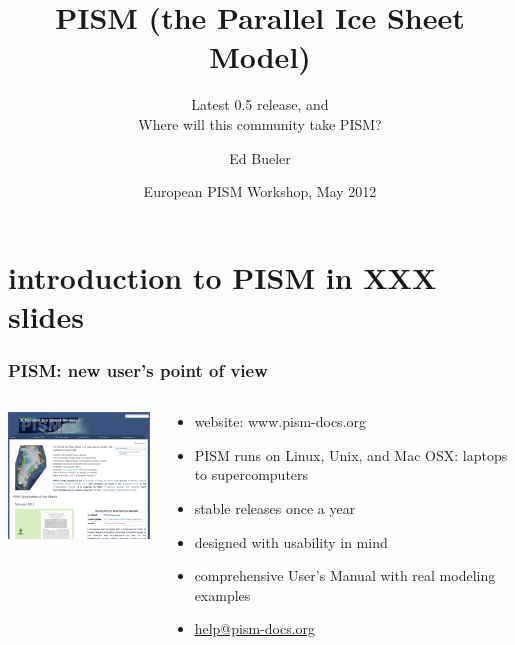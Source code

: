 \documentclass[hide notes,intlimits]{beamer}
\title[PISM (the Parallel Ice Sheet Model)] %
{PISM (the Parallel Ice Sheet Model)}
\subtitle{Latest 0.5 release, and \\ Where will this community take PISM?}
\author[Bueler]{Ed Bueler}
\institute{
University of Alaska Fairbanks
}
\date{European PISM Workshop, May 2012}
\begin{document}


{
} 

\begin{frame}
  \titlepage
\end{frame}

{
}

\section[introduction]{introduction to PISM in XXX slides}

\begin{frame}
  \frametitle{PISM: new user's point of view}
  \begin{columns}
    \begin{column}{50mm}
      \includegraphics[width=50mm]{pismdocs.png}
    \end{column}
    \begin{column}{70mm}
      \begin{itemize}
      \item website: \alert{www.pism-docs.org}
      \item PISM runs on Linux, Unix, and Mac OSX: laptops to supercomputers
      \item stable releases once a year
      \item designed with usability in mind
      \item comprehensive User's Manual with real modeling examples
      \item \url{help@pism-docs.org}
      \end{itemize}
    \end{column}
  \end{columns}
\end{frame}
\end{document}
